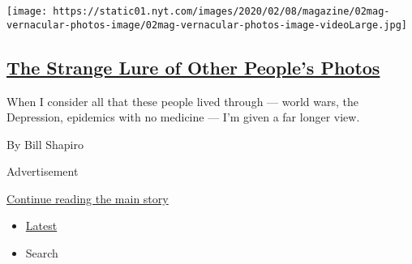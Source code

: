 \begin{enumerate}
  \texttt{[image: https://static01.nyt.com/images/2020/02/08/magazine/02mag-vernacular-photos-image/02mag-vernacular-photos-image-videoLarge.jpg]}

  \hypertarget{the-strange-lure-of-other-peoples-photos}{%
  \subsection{\texorpdfstring{\href{/2020/07/30/magazine/the-strange-lure-of-other-peoples-photos.html}{The
  Strange Lure of Other People's
  Photos}}{The Strange Lure of Other People's Photos}}\label{the-strange-lure-of-other-peoples-photos}}

  When I consider all that these people lived through --- world wars,
  the Depression, epidemics with no medicine --- I'm given a far longer
  view.

  By Bill Shapiro
\end{enumerate}

Advertisement

\protect\hyperlink{after-mid1}{Continue reading the main story}

\begin{itemize}
\tightlist
\item
  \protect\hyperlink{stream-panel}{Latest}
\item
  Search
\end{itemize}

